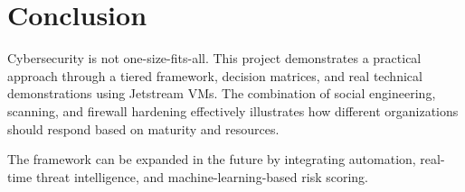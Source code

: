 \documentclass{article}
\begin{document}
\section{Conclusion}

Cybersecurity is not one-size-fits-all. This project demonstrates a practical approach through a tiered framework, decision matrices, and real technical demonstrations using Jetstream VMs. The combination of social engineering, scanning, and firewall hardening effectively illustrates how different organizations should respond based on maturity and resources.

The framework can be expanded in the future by integrating automation, real-time threat intelligence, and machine-learning-based risk scoring.
\end{document}
